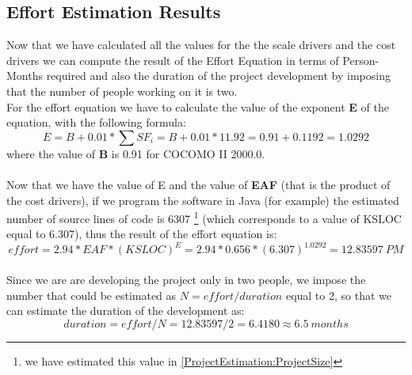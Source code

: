 \documentclass[\mainpath/main]{subfiles}
\begin{document}
\subsection{Effort Estimation Results}
Now that we have calculated all the values for the the scale drivers and the cost drivers we can compute the result of the Effort Equation in terms of Person-Months required and also the duration of the project development by imposing that the number of people working on it is two.\\
For the effort equation we have to calculate the value of the exponent \textbf{E} of the equation, with the following formula:
\[
E = B + 0.01 * \sum SF_{i} = B + 0.01 * 11.92 = 0.91 + 0.1192 = 1.0292
\]
where the value of \textbf{B} is 0.91 for COCOMO II 2000.0.\\
\\
Now that we have the value of E and the value of \textbf{EAF} (that is the product of the cost drivers), if we program the software in Java (for example) the estimated number of source lines of code is 6307 \footnote{we have estimated this value in \autoref{ProjectEstimation:ProjectSize}} (which corresponds to a value of KSLOC equal to 6.307), thus the result of the effort equation is:
\[
effort = 2.94 * EAF * (KSLOC)^E = 2.94 * 0.656 * (6.307)^{1.0292} = 12.83597\ PM
\]
\\
Since we are are developing the project only in two people, we impose the number that could be estimated as $N = effort / duration$ equal to 2, so that we can estimate the duration of the development as:
\[
duration = effort / N = 12.83597 / 2 = 6.4180 \approx 6.5\ months
\]
\end{document}
